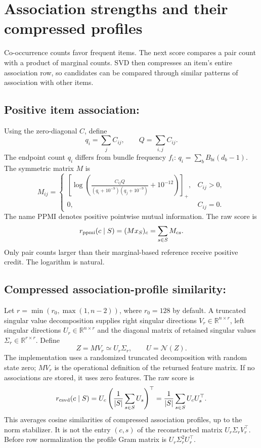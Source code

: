 \documentclass[11pt,a4paper]{article}
\newcommand{\pos}[1]{\left[#1\right]_{+}}
\newcommand{\rn}{\mathcal N}
\DeclareRobustCommand{\key}[1]{\texttt{\detokenize{#1}}}
\begin{document}
\section{Association strengths and their compressed profiles}

Co-occurrence counts favor frequent items. The next score compares a pair
count with a product of marginal counts. SVD then compresses an item's entire
association row, so candidates can be compared through similar patterns of
association with other items.

\subsection{Positive item association: \key{ppmi}}
Using the zero-diagonal $C$, define
\[
 q_i=\sum_jC_{ij},\qquad Q=\sum_{i,j}C_{ij}.
\]
The endpoint count $q_i$ differs from bundle frequency $f_i$:
$q_i=\sum_bB_{bi}(d_b-1)$. The symmetric matrix $M$ is
\begin{equation}
 M_{ij}=\begin{cases}
 \displaystyle\pos{\log\!\left(
 \frac{C_{ij}Q}{(q_i+10^{-9})(q_j+10^{-9})}+10^{-12}\right)},&C_{ij}>0,\\
 0,&C_{ij}=0.
 \end{cases}
\end{equation}
The name PPMI denotes positive pointwise mutual information. The raw score is
\begin{equation}
 r_{\rm ppmi}(c\mid S)=(Mx_S)_c=\sum_{s\in S}M_{cs}.
\end{equation}
Only pair counts larger than their marginal-based reference receive positive
credit. The logarithm is natural.

\subsection{Compressed association-profile similarity: \key{csvd}}
Let $r=\min(r_0,\max(1,n-2))$, where $r_0=128$ by default. A truncated
singular value decomposition supplies right singular directions
$V_r\in\mathbb R^{n\times r}$, left singular directions
$U_r\in\mathbb R^{n\times r}$ and the diagonal matrix of retained singular
values $\Sigma_r\in\mathbb R^{r\times r}$. Define
\begin{equation}
 Z=MV_r\simeq U_r\Sigma_r,\qquad U=\rn(Z).
\end{equation}
The implementation uses a randomized truncated decomposition with random
state zero; $MV_r$ is the operational definition of the returned feature
matrix. If no associations are stored, it uses zero features.
The raw score is
\begin{equation}
 r_{\rm csvd}(c\mid S)=U_c\left(\frac1{|S|}\sum_{s\in S}U_s\right)^\top
 =\frac1{|S|}\sum_{s\in S}U_cU_s^\top.
\end{equation}
This averages cosine similarities of compressed association profiles, up to
the norm stabilizer. It is not the entry $(c,s)$ of the reconstructed matrix
$U_r\Sigma_rV_r^\top$. Before row normalization the profile Gram matrix is
$U_r\Sigma_r^2U_r^\top$.
\end{document}

